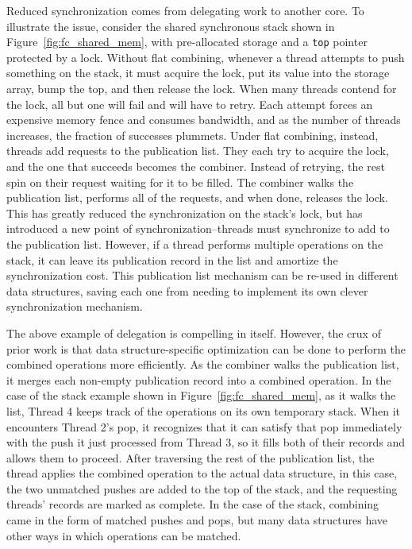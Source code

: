 

Reduced synchronization comes from delegating work to another core.
To illustrate the issue, consider the shared synchronous stack shown in Figure~\ref{fig:fc_shared_mem}, with pre-allocated storage and a \texttt{top} pointer protected by a lock. Without flat combining, whenever a thread attempts to push something on the stack, it must acquire the lock, put its value into the storage array, bump the top, and then release the lock. When many threads contend for the lock, all but one will fail and will have to retry. Each attempt forces an expensive memory fence and consumes bandwidth, and as the number of threads increases, the fraction of successes plummets. Under flat combining, instead, threads add requests to the publication list. They each try to acquire the lock, and the one that succeeds becomes the combiner. Instead of retrying, the rest spin on their request waiting for it to be filled. The combiner walks the publication list, performs all of the requests, and when done, releases the lock. This has greatly reduced the synchronization on the stack's lock, but has introduced a new point of synchronization--threads must synchronize to add to the publication list. However, if a thread performs multiple operations on the stack, it can leave its publication record in the list and amortize the synchronization cost. This publication list mechanism can be re-used in different data structures, saving each one from needing to implement its own clever synchronization mechanism.

The above example of delegation is compelling in itself. However, the crux of prior work is that data structure-specific optimization can be done to perform the combined operations more efficiently.
As the combiner walks the publication list, it merges each non-empty publication record into a combined operation. In the case of the stack example shown in Figure~\ref{fig:fc_shared_mem}, as it walks the list, Thread 4 keeps track of the operations on its own temporary stack. When it encounters Thread 2's pop, it recognizes that it can satisfy that pop immediately with the push it just processed from Thread 3, so it fills both of their records and allows them to proceed. After traversing the rest of the publication list, the thread applies the combined operation to the actual data structure, in this case, the two unmatched pushes are added to the top of the stack, and the requesting threads' records are marked as complete.
In the case of the stack, combining came in the form of matched pushes and pops, but many data structures have other ways in which operations can be matched.

